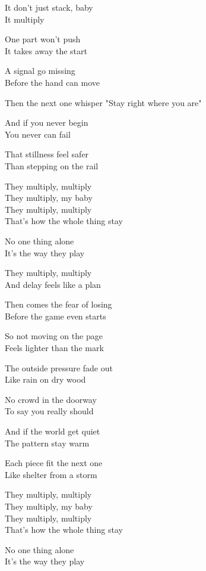 \begin{lyrics}
It don't just stack, baby\\
It multiply

One part won't push\\
It takes away the start

A signal go missing\\
Before the hand can move

Then the next one whisper
"Stay right where you are"

And if you never begin\\
You never can fail

That stillness feel safer\\
Than stepping on the rail

They multiply, multiply\\
They multiply, my baby\\
They multiply, multiply\\
That's how the whole thing stay

No one thing alone\\
It's the way they play

They multiply, multiply\\
And delay feels like a plan

Then comes the fear of losing\\
Before the game even starts

So not moving on the page\\
Feels lighter than the mark

The outside pressure fade out\\
Like rain on dry wood

No crowd in the doorway\\
To say you really should

And if the world get quiet\\
The pattern stay warm

Each piece fit the next one\\
Like shelter from a storm

They multiply, multiply\\
They multiply, my baby\\
They multiply, multiply\\
That's how the whole thing stay

No one thing alone\\
It's the way they play


\end{lyrics}

